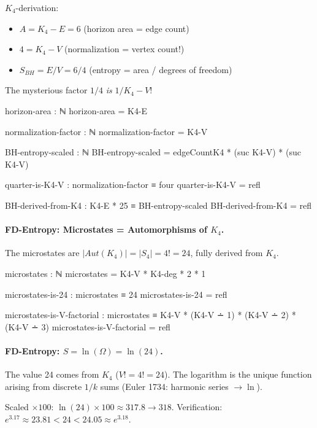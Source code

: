\documentclass[11pt,a4paper]{book}
\def\mathrm#1{#1}%
\def\text#1{#1}%
\begin{document}
$K_4$-derivation:
\begin{itemize}
  \item $A = K_4\text{-}E = 6$ (horizon area = edge count)
  \item $4 = K_4\text{-}V$ (normalization = vertex count!)
  \item $S_{BH} = E/V = 6/4$ (entropy = area / degrees of freedom)
\end{itemize}
The mysterious factor $1/4$ \emph{is} $1/K_4\text{-}V$!

\begin{code}
  horizon-area : ℕ
  horizon-area = K4-E

  normalization-factor : ℕ
  normalization-factor = K4-V

  BH-entropy-scaled : ℕ
  BH-entropy-scaled = edgeCountK4 * (suc K4-V) * (suc K4-V)

  quarter-is-K4-V : normalization-factor ≡ four
  quarter-is-K4-V = refl

  BH-derived-from-K4 : K4-E * 25 ≡ BH-entropy-scaled
  BH-derived-from-K4 = refl

\end{code}

\paragraph{FD-Entropy: Microstates = Automorphisms of $K_4$.}
The microstates are $|\mathrm{Aut}(K_4)| = |S_4| = 4! = 24$, fully derived from $K_4$.

\begin{code}
  microstates : ℕ
  microstates = K4-V * K4-deg * 2 * 1

  microstates-is-24 : microstates ≡ 24
  microstates-is-24 = refl

  microstates-is-V-factorial : microstates ≡ K4-V * (K4-V ∸ 1) * (K4-V ∸ 2) * (K4-V ∸ 3)
  microstates-is-V-factorial = refl

\end{code}

\paragraph{FD-Entropy: $S = \ln(\Omega) = \ln(24)$.}
The value 24 comes from $K_4$ ($V! = 4! = 24$). The logarithm is the unique function 
arising from discrete $1/k$ sums (Euler 1734: harmonic series $\to \ln$).

Scaled $\times 100$: $\ln(24) \times 100 \approx 317.8 \to 318$.
Verification: $e^{3.17} \approx 23.81 < 24 < 24.05 \approx e^{3.18}$.
\end{document}
